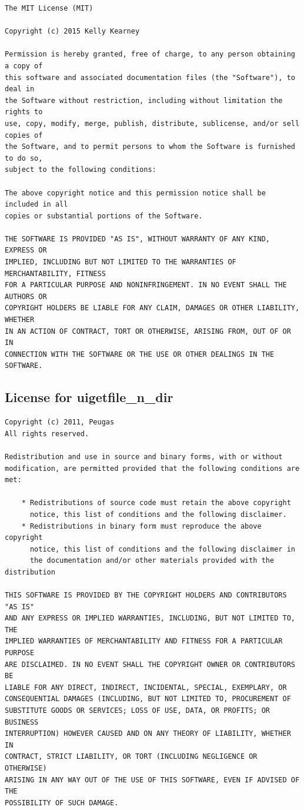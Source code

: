 \documentclass[a4paper, oneside, onecolumn, 11pt]{article}
\begin{document}
\begingroup
\footnotesize
\begin{verbatim}
The MIT License (MIT)

Copyright (c) 2015 Kelly Kearney

Permission is hereby granted, free of charge, to any person obtaining a copy of
this software and associated documentation files (the "Software"), to deal in
the Software without restriction, including without limitation the rights to
use, copy, modify, merge, publish, distribute, sublicense, and/or sell copies of
the Software, and to permit persons to whom the Software is furnished to do so,
subject to the following conditions:

The above copyright notice and this permission notice shall be included in all
copies or substantial portions of the Software.

THE SOFTWARE IS PROVIDED "AS IS", WITHOUT WARRANTY OF ANY KIND, EXPRESS OR
IMPLIED, INCLUDING BUT NOT LIMITED TO THE WARRANTIES OF MERCHANTABILITY, FITNESS
FOR A PARTICULAR PURPOSE AND NONINFRINGEMENT. IN NO EVENT SHALL THE AUTHORS OR
COPYRIGHT HOLDERS BE LIABLE FOR ANY CLAIM, DAMAGES OR OTHER LIABILITY, WHETHER
IN AN ACTION OF CONTRACT, TORT OR OTHERWISE, ARISING FROM, OUT OF OR IN
CONNECTION WITH THE SOFTWARE OR THE USE OR OTHER DEALINGS IN THE SOFTWARE.
\end{verbatim}
\endgroup

\subsection{License for uigetfile\_n\_dir}
\label{sec:uigetfile}

\begingroup
\footnotesize
\begin{verbatim}
Copyright (c) 2011, Peugas
All rights reserved.

Redistribution and use in source and binary forms, with or without 
modification, are permitted provided that the following conditions are 
met:

    * Redistributions of source code must retain the above copyright 
      notice, this list of conditions and the following disclaimer.
    * Redistributions in binary form must reproduce the above copyright 
      notice, this list of conditions and the following disclaimer in 
      the documentation and/or other materials provided with the distribution
      
THIS SOFTWARE IS PROVIDED BY THE COPYRIGHT HOLDERS AND CONTRIBUTORS "AS IS" 
AND ANY EXPRESS OR IMPLIED WARRANTIES, INCLUDING, BUT NOT LIMITED TO, THE 
IMPLIED WARRANTIES OF MERCHANTABILITY AND FITNESS FOR A PARTICULAR PURPOSE 
ARE DISCLAIMED. IN NO EVENT SHALL THE COPYRIGHT OWNER OR CONTRIBUTORS BE 
LIABLE FOR ANY DIRECT, INDIRECT, INCIDENTAL, SPECIAL, EXEMPLARY, OR 
CONSEQUENTIAL DAMAGES (INCLUDING, BUT NOT LIMITED TO, PROCUREMENT OF 
SUBSTITUTE GOODS OR SERVICES; LOSS OF USE, DATA, OR PROFITS; OR BUSINESS 
INTERRUPTION) HOWEVER CAUSED AND ON ANY THEORY OF LIABILITY, WHETHER IN 
CONTRACT, STRICT LIABILITY, OR TORT (INCLUDING NEGLIGENCE OR OTHERWISE) 
ARISING IN ANY WAY OUT OF THE USE OF THIS SOFTWARE, EVEN IF ADVISED OF THE 
POSSIBILITY OF SUCH DAMAGE.
\end{verbatim}
\endgroup


\end{document}
